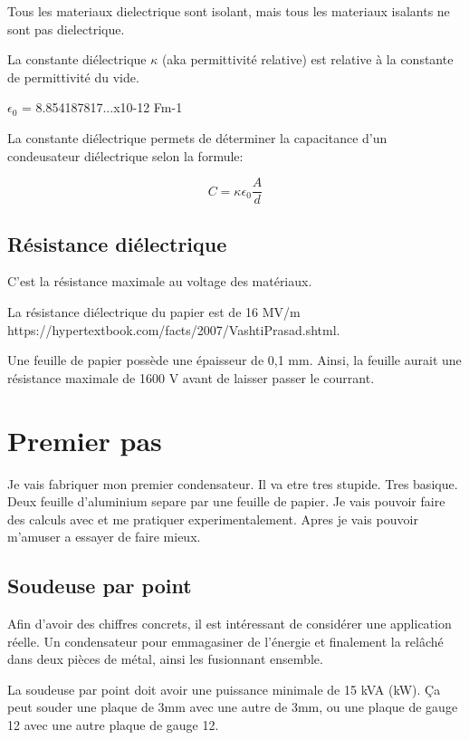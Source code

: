 \documentclass[12 pt, a4paper]{report} %
\begin{document}
Tous les materiaux dielectrique sont isolant, mais tous les materiaux isalants ne sont pas dielectrique.

La constante diélectrique $\kappa$ (aka permittivité relative) est relative à la constante de permittivité du vide.

$\epsilon_{0}$ = 8.854187817...x10-12 Fm-1

La constante diélectrique permets de déterminer la capacitance d'un condeusateur diélectrique selon la formule:

\[C=\kappa\epsilon_{0}\frac{A}{d}\]



\subsection{Résistance diélectrique}

C'est la résistance maximale au voltage des matériaux.

La résistance diélectrique du papier est de 16 MV/m https://hypertextbook.com/facts/2007/VashtiPrasad.shtml.

Une feuille de papier possède une épaisseur de 0,1 mm. Ainsi, la feuille aurait une résistance maximale de 1600 V avant de laisser passer le courrant.

\pagebreak

\section{Premier pas}

Je vais fabriquer mon premier condensateur. Il va etre tres stupide. Tres basique. Deux feuille d'aluminium separe par une feuille de papier. Je vais pouvoir faire des calculs avec et me pratiquer experimentalement. Apres je vais pouvoir m'amuser a essayer de faire mieux.

\subsection{Soudeuse par point}

Afin d'avoir des chiffres concrets, il est intéressant de considérer une application réelle. Un condensateur pour emmagasiner de l'énergie et finalement la relâché dans deux pièces de métal, ainsi les fusionnant ensemble.

La soudeuse par point doit avoir une puissance minimale de 15 kVA (kW).
Ça peut souder une plaque de 3mm avec une autre de 3mm, ou une plaque de gauge 12 avec une autre plaque de gauge 12.
\end{document}
